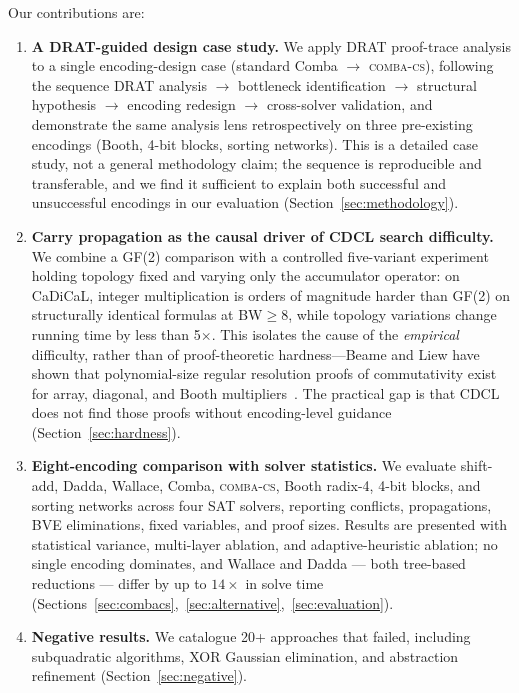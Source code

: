 \documentclass[a4paper]{ceurart}
\newcommand{\combacs}{\textsc{comba-cs}\xspace}
\begin{document}
Our contributions are:

\begin{enumerate}
\item \textbf{A DRAT-guided design case study.} We apply DRAT
  proof-trace analysis to a single encoding-design case
  (standard Comba $\to$ \combacs), following the sequence
  DRAT analysis $\to$ bottleneck identification $\to$
  structural hypothesis $\to$ encoding redesign $\to$
  cross-solver validation, and demonstrate the same analysis
  lens retrospectively on three pre-existing encodings
  (Booth, 4-bit blocks, sorting networks). This is a detailed
  case study, not a general methodology claim; the sequence is
  reproducible and transferable, and we find it sufficient to
  explain both successful and unsuccessful encodings in our
  evaluation (Section~\ref{sec:methodology}).

\item \textbf{Carry propagation as the causal driver of CDCL
  search difficulty.} We combine a GF(2) comparison with a
  controlled five-variant experiment holding topology fixed and
  varying only the accumulator operator: on CaDiCaL, integer
  multiplication is orders of magnitude harder than GF(2) on
  structurally identical formulas at BW$\geq$8, while topology
  variations change running time by less than 5$\times$. This
  isolates the cause of the \emph{empirical} difficulty, rather
  than of proof-theoretic hardness---Beame and Liew have shown
  that polynomial-size regular resolution proofs of
  commutativity exist for array, diagonal, and Booth
  multipliers~\cite{beame2019toward}. The practical gap is
  that CDCL does not find those proofs without encoding-level
  guidance (Section~\ref{sec:hardness}).

\item \textbf{Eight-encoding comparison with solver statistics.} We
  evaluate shift-add, Dadda, Wallace, Comba, \combacs, Booth
  radix-4, 4-bit blocks, and sorting networks across four SAT
  solvers, reporting conflicts, propagations, BVE eliminations,
  fixed variables, and proof sizes. Results are presented with
  statistical variance, multi-layer ablation, and adaptive-heuristic
  ablation; no single encoding dominates, and Wallace and Dadda
  --- both tree-based reductions --- differ by up to
  $14\times$ in solve time
  (Sections~\ref{sec:combacs},~\ref{sec:alternative},~\ref{sec:evaluation}).

\item \textbf{Negative results.} We catalogue 20+ approaches that
  failed, including subquadratic algorithms, XOR Gaussian
  elimination, and abstraction refinement
  (Section~\ref{sec:negative}).
\end{enumerate}
\end{document}
